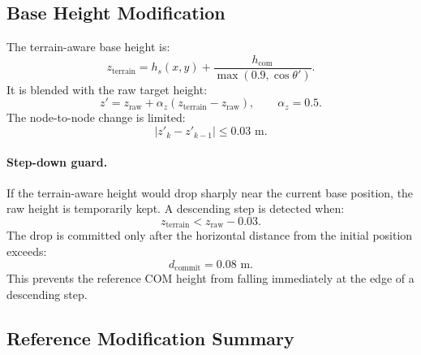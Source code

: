 \documentclass[11pt,a4paper]{article}
\begin{document}
\subsection{Base Height Modification}

The terrain-aware base height is:
\begin{equation}
	z_{\text{terrain}}
	=
	h_s(x,y)
	+
	\frac{h_{\text{com}}}{\max(0.9,\cos\theta')}.
\end{equation}
It is blended with the raw target height:
\begin{equation}
	z'
	=
	z_{\text{raw}}
	+
	\alpha_z(z_{\text{terrain}}-z_{\text{raw}}),
	\qquad
	\alpha_z=0.5.
\end{equation}
The node-to-node change is limited:
\begin{equation}
	|z'_k-z'_{k-1}|
	\leq
	0.03\text{ m}.
\end{equation}

\paragraph{Step-down guard.}
If the terrain-aware height would drop sharply near the current base position, the raw height is temporarily kept. A descending step is detected when:
\begin{equation}
	z_{\text{terrain}} < z_{\text{raw}} - 0.03.
\end{equation}
The drop is committed only after the horizontal distance from the initial position exceeds:
\begin{equation}
	d_{\text{commit}} = 0.08\text{ m}.
\end{equation}
This prevents the reference COM height from falling immediately at the edge of a descending step.

\subsection{Reference Modification Summary}
\end{document}

